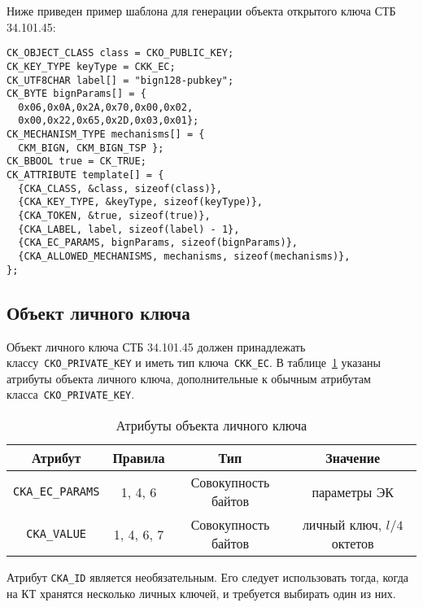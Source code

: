 
Ниже приведен пример шаблона для генерации объекта открытого ключа СТБ 34.101.45:
\begin{verbatim}
CK_OBJECT_CLASS class = CKO_PUBLIC_KEY;
CK_KEY_TYPE keyType = CKK_EC;
CK_UTF8CHAR label[] = "bign128-pubkey";
CK_BYTE bignParams[] = {
  0x06,0x0A,0x2A,0x70,0x00,0x02,
  0x00,0x22,0x65,0x2D,0x03,0x01};
CK_MECHANISM_TYPE mechanisms[] = {
  CKM_BIGN, CKM_BIGN_TSP };
CK_BBOOL true = CK_TRUE;
CK_ATTRIBUTE template[] = {
  {CKA_CLASS, &class, sizeof(class)},
  {CKA_KEY_TYPE, &keyType, sizeof(keyType)},
  {CKA_TOKEN, &true, sizeof(true)},
  {CKA_LABEL, label, sizeof(label) - 1},
  {CKA_EC_PARAMS, bignParams, sizeof(bignParams)},
  {CKA_ALLOWED_MECHANISMS, mechanisms, sizeof(mechanisms)},
};
\end{verbatim}



\subsection{Объект личного ключа}


Объект личного ключа СТБ 34.101.45 должен принадлежать
классу~\verb|CKO_PRIVATE_KEY| и иметь тип ключа~\verb|CKK_EC|.
В таблице~\ref{Table.CRYPTOKI.EcPrivkeyAttrs} указаны
атрибуты объекта личного ключа, дополнительные к обычным
атрибутам класса~\verb|CKO_PRIVATE_KEY|.

\begin{table}[H]
\caption{Атрибуты объекта личного ключа}\label{Table.CRYPTOKI.EcPrivkeyAttrs}
\begin{tabular}{|c|c|c|c|}
\hline
Атрибут & Правила & Тип & Значение\\
\hline
\hline
\verb|CKA_EC_PARAMS| & 1, 4, 6 & Совокупность байтов &
параметры ЭК\\
\hline
\verb|CKA_VALUE| & 1, 4, 6, 7 & Совокупность байтов &
личный ключ, $l/4$ октетов\\
\hline
\end{tabular}
\end{table}

Атрибут \verb|CKA_ID| является необязательным. 
Его следует использовать тогда, когда на КТ хранятся 
несколько личных ключей, и требуется выбирать один из них.


